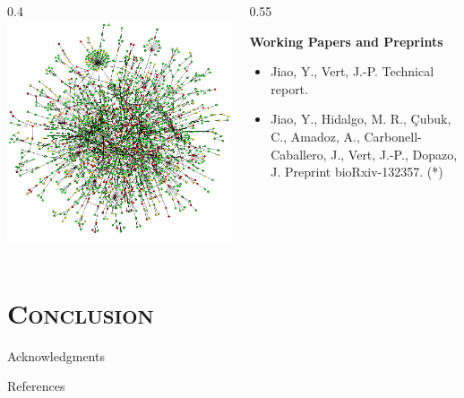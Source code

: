 \documentclass[xcolor=x11names,compress]{beamer}
\theoremstyle{plain}
\renewcommand{\(}{\begin{columns}}
\renewcommand{\)}{\end{columns}}
\newcommand{\<}[1]{\begin{column}{#1}}
\renewcommand{\>}{\end{column}}
\newcommand{\addsectiontitlepage}{
	\hfill\leavevmode
  \vtop{
    \huge\hbox{\color{myblue}\insertsection}
    \kern.5ex %
    \vspace{1cm}
  }
}
\begin{document}
\begin{frame}
	
	\addsectiontitlepage
	
	\(
	\<{0.4\linewidth}
	\includegraphics[width=\columnwidth]{slides/ppi}
	\>
	
	\<{0.55\linewidth}
	\begin{footnotesize}
	\textbf{Working Papers and Preprints}
	\begin{itemize}
		\item \nocite{Jiao2017Network} Jiao, Y., Vert, J.-P. Technical report.
		\item \nocite{Jiao2017Signaling} Jiao, Y., Hidalgo, M. R., \c{C}ubuk, C., Amadoz, A., Carbonell-Caballero, J., Vert, J.-P., Dopazo, J. Preprint bioRxiv-132357. (*)
	\end{itemize}
	\end{footnotesize}
	\>
	\)
	
\end{frame}


\section{\scshape Conclusion}


\begin{frame}{\insertsection}
	
\end{frame}


\begin{frame}{Acknowledgments}
	
\end{frame}


\begin{frame}[allowframebreaks]{References}
	
	\tiny
	
	
	
\end{frame}
\end{document}
